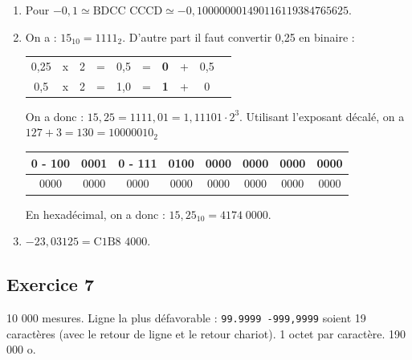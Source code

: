 \documentclass[10pt,fleqn]{article} %
\begin{document}
\begin{multicols}{2}
\begin{enumerate}
\item Pour $-0,1\simeq \text{BDCC CCCD} \simeq -0,100000001490116119384765625$.

\item On a : $15_{10}=1111_2$. D'autre part il faut convertir 0,25 en binaire : 

\begin{tabular}{cccccccccc}
0,25 & x & 2 & = & 0,5 & =& \textbf{0} & + & 0,5 \\
0,5 & x & 2 & = & 1,0 & =& \textbf{1} & + & 0 \\
\end{tabular}

On a donc : $15,25=1111,01 = 1,11101 \cdot 2^{3}$. Utilisant l'exposant décalé, on a $127+3 = 130=10000010_2$

\noindent \begin{tabular}{|c|c|c|c|c|c|c|c|}
\hline
0 - 100&0001 & 0 - 111& 0100& 0000& 0000& 0000& 0000 \\
\hline
0000 & 0000& 0000& 0000& 0000& 0000& 0000& 0000 \\
\hline
\end{tabular}

En hexadécimal, on a donc :  $15,25_{10} =4174\; 0000 $.

\item  $-23,03125 = \text{C1B8 4000}$.
\end{enumerate}

\subsection*{Exercice 7}
10 000 mesures. Ligne la plus défavorable : \texttt{99.9999 -999,9999} soient 19 caractères (avec le retour de ligne et le retour chariot). 1 octet par caractère. 190 000 o.


\end{multicols}
\end{document}
